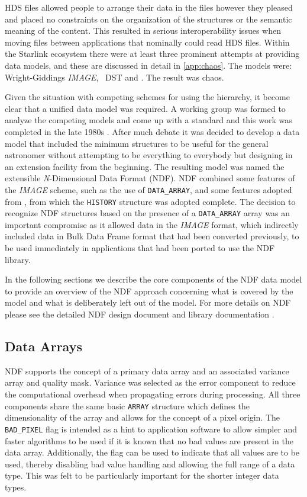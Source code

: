 \documentclass[final,authoryear,5p,times,twocolumn]{elsarticle}
\begin{document}
HDS files allowed people to arrange their data in the files however
they pleased and placed no constraints on the organization of the
structures or the semantic meaning of the content. This resulted in
serious interoperability issues when moving files between applications
that nominally could read HDS files. Within the Starlink ecosystem
there were at least three prominent attempts at providing data
models, and these are discussed in detail in \ref{app:chaos}. The
models were: Wright-Giddings \emph{IMAGE}, \figaro\ DST and \asterix.
The result was chaos.

Given the situation with competing schemes for using the hierarchy, it
become clear that a unified data model was required. A working group
was formed to analyze the competing models and come up with a standard and this work
was completed in the late 1980s \citep{1988STARB...2...11C,SGP38}.
After much debate it was decided to develop a data model that included
the minimum structures to be useful for the general astronomer without
attempting to be everything to everybody but designing in an extension
facility from the beginning. The resulting model was named the
extensible \emph{N}-Dimensional Data Format (NDF).  NDF combined some
features of the \emph{IMAGE} scheme, such as the use of
\texttt{DATA\_ARRAY}, and some features adopted from \asterix, from
which the \texttt{HISTORY} structure was adopted complete.  The
decision to recognize NDF structures based on the presence of a
\texttt{DATA\_ARRAY} array was an important compromise as it allowed
data in the \emph{IMAGE} format, which indirectly included data in
Bulk Data Frame \citep[BDF;][]{1980SPIE..264...70P,SUN4}
format that had been converted previously, to be used immediately
in applications that had been ported to use the NDF library.

In the following sections we describe the core components of the NDF
data model to provide an overview of the NDF approach concerning what
is covered by the model and what is deliberately left out of the
model. For more details on NDF please see the detailed NDF design
document \citep[SGP/38;][]{SGP38} and library documentation \citep[SUN/33;][]{SUN33}.

\subsection{Data Arrays}

NDF supports the concept of a primary data array and an associated
variance array and quality mask. Variance was selected as the error
component to reduce the computational overhead when propagating errors
during processing. All three components share the same
basic \texttt{ARRAY} structure which defines the dimensionality of the
array and allows for the concept of a pixel origin. The
\texttt{BAD\_PIXEL} flag is intended as a hint to application
software to allow simpler and faster algorithms to be used if it is known
that no bad values are present in the data array. Additionally, the flag
can be used to indicate that all values are to be used, thereby
disabling bad value handling and allowing the full range of a data
type. This was felt to be particularly important for the shorter
integer data types.
\end{document}
